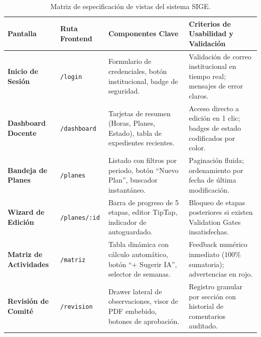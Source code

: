 \documentclass[12pt,a4paper]{article}
\begin{document}
\begin{table}[H]
\centering
\small
\renewcommand{\arraystretch}{1.2}
\begin{tabularx}{\textwidth}{|>{\hsize=0.8\hsize\raggedright\arraybackslash\bfseries\footnotesize}X|>{\hsize=0.7\hsize\centering\arraybackslash\footnotesize}X|>{\hsize=1.25\hsize\raggedright\arraybackslash\footnotesize}X|>{\hsize=1.25\hsize\raggedright\arraybackslash\footnotesize}X|}
\hline
\rowcolor{tableheader}
\textbf{Pantalla} & \textbf{Ruta Frontend} & \textbf{Componentes Clave} & \textbf{Criterios de Usabilidad y Validación} \\
\hline
Inicio de Sesión & \texttt{/\allowbreak  login} & Formulario de credenciales, botón institucional, badge de seguridad. & Validación de correo institucional en tiempo real; mensajes de error claros. \\
\hline
Dashboard Docente & \texttt{/\allowbreak  dashboard} & Tarjetas de resumen (Horas, Planes, Estado), tabla de expedientes recientes. & Acceso directo a edición en 1 clic; badges de estado codificados por color. \\
\hline
Bandeja de Planes & \texttt{/\allowbreak  planes} & Listado con filtros por periodo, botón ``Nuevo Plan'', buscador instantáneo. & Paginación fluida; ordenamiento por fecha de última modificación. \\
\hline
Wizard de Edición & \texttt{/\allowbreak  planes/\allowbreak  :id} & Barra de progreso de 5 etapas, editor TipTap, indicador de autoguardado. & Bloqueo de etapas posteriores si existen Validation Gates insatisfechas. \\
\hline
Matriz de Actividades & \texttt{/\allowbreak  matriz} & Tabla dinámica con cálculo automático, botón ``+ Sugerir IA'', selector de semanas. & Feedback numérico inmediato ($100\%$ sumatoria); advertencias en rojo. \\
\hline
Revisión de Comité & \texttt{/\allowbreak  revision} & Drawer lateral de observaciones, visor de PDF embebido, botones de aprobación. & Registro granular por sección con historial de comentarios auditado. \\
\hline
\end{tabularx}
\caption{Matriz de especificación de vistas del sistema SIGE.}
\label{tab:vistas_ui}
\end{table}
\end{document}
